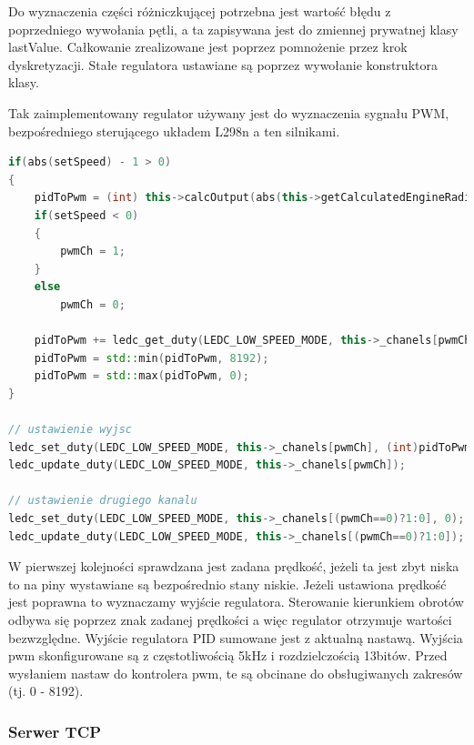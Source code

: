 Do wyznaczenia części różniczkującej potrzebna jest wartość błędu z poprzedniego wywołania pętli, a ta zapisywana jest do zmiennej prywatnej klasy lastValue. 
Całkowanie zrealizowane jest poprzez pomnożenie przez krok dyskretyzacji. Stałe regulatora ustawiane są poprzez wywołanie konstruktora klasy.

Tak zaimplementowany regulator używany jest do wyznaczenia sygnału PWM, bezpośredniego sterującego układem L298n a ten silnikami. 

\begin{lstlisting}[language=C++,caption=Wyznaczenie modulacji PWM,label={kodCPPPWM}]
if(abs(setSpeed) - 1 > 0)
{
	pidToPwm = (int) this->calcOutput(abs(this->getCalculatedEngineRadialSpeed()), abs(setSpeed));
	if(setSpeed < 0)
	{
		pwmCh = 1;
	}
	else
		pwmCh = 0;

	pidToPwm += ledc_get_duty(LEDC_LOW_SPEED_MODE, this->_chanels[pwmCh]);
	pidToPwm = std::min(pidToPwm, 8192);
	pidToPwm = std::max(pidToPwm, 0);
}

// ustawienie wyjsc
ledc_set_duty(LEDC_LOW_SPEED_MODE, this->_chanels[pwmCh], (int)pidToPwm);
ledc_update_duty(LEDC_LOW_SPEED_MODE, this->_chanels[pwmCh]);

// ustawienie drugiego kanalu
ledc_set_duty(LEDC_LOW_SPEED_MODE, this->_chanels[(pwmCh==0)?1:0], 0);
ledc_update_duty(LEDC_LOW_SPEED_MODE, this->_chanels[(pwmCh==0)?1:0]);
\end{lstlisting}

W pierwszej kolejności sprawdzana jest zadana prędkość, jeżeli ta jest zbyt niska to na piny wystawiane są bezpośrednio stany niskie.
Jeżeli ustawiona prędkość jest poprawna to wyznaczamy wyjście regulatora. Sterowanie kierunkiem obrotów odbywa 
się poprzez znak zadanej prędkości a więc regulator otrzymuje wartości bezwzględne. 
Wyjście regulatora PID sumowane jest z aktualną nastawą. Wyjścia pwm skonfigurowane są z częstotliwością 5kHz i rozdzielczością 13bitów. 
Przed wysłaniem nastaw do kontrolera pwm, te są obcinane do obsługiwanych zakresów (tj. 0 - 8192).

\subsubsection{Serwer TCP}

